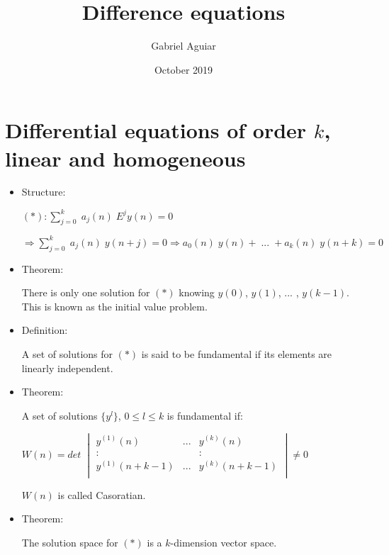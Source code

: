 \documentclass{article}
\title{Difference equations}
\author{Gabriel Aguiar}
\date{October 2019}
\begin{document}
\maketitle

\section{Differential equations of order $k$, linear and homogeneous}

\begin{itemize}

\item Structure:

$(*): \sum\limits_{j = 0}^{k} \; a_{j} (n)\; E^{j} y(n) = 0$

$\Rightarrow \sum\limits_{j = 0}^{k} \; a_{j} (n)\; y(n + j) = 0 \Rightarrow a_{0} (n) \; y(n) + \; ... \; + a_{k} (n) \; y(n + k) = 0$

\item Theorem:

There is only one solution for $(*)$ knowing $y(0)$, $y(1)$, ... , $y(k - 1)$. This is known as the initial value problem.

\item Definition:

A set of solutions for $(*)$ is said to be fundamental if its elements are linearly independent.

\item Theorem:

A set of solutions $ \{ y^{l} \}$, $0 \leq l \leq k$ is fundamental if:

\hfill

$W(n) = det \; \begin{vmatrix} y^{(1)} (n) & ... & y^{(k)} (n) \\ : &  & : \\ y^{(1)} (n + k - 1) & ... & y^{(k)} (n + k - 1) \\ \end{vmatrix} \neq 0$

\hfill

$W(n)$ is called Casoratian.

\item Theorem:

The solution space for $(*)$ is a $k$-dimension vector space.
    
\end{itemize}

\hfill

\hfill
\end{document}
